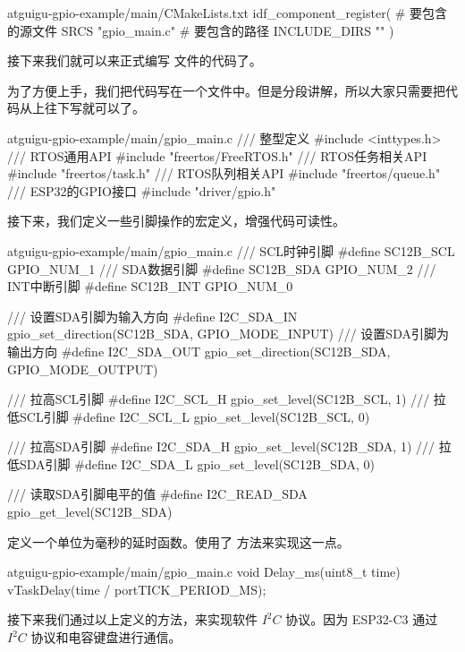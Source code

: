 \documentclass[lang=cn,newtx,10pt,scheme=chinese]{elegantbook}
\begin{document}
\begin{mycode}{atguigu-gpio-example/main/CMakeLists.txt}
idf_component_register(
    # 要包含的源文件
    SRCS "gpio_main.c"
    # 要包含的路径
    INCLUDE_DIRS ""
)
\end{mycode}

接下来我们就可以来正式编写  文件的代码了。

为了方便上手，我们把代码写在一个文件中。但是分段讲解，所以大家只需要把代码从上往下写就可以了。

\begin{mycode}{atguigu-gpio-example/main/gpio\_main.c}
/// 整型定义
#include <inttypes.h>
/// RTOS通用API
#include "freertos/FreeRTOS.h"
/// RTOS任务相关API
#include "freertos/task.h"
/// RTOS队列相关API
#include "freertos/queue.h"
/// ESP32的GPIO接口
#include "driver/gpio.h"
\end{mycode}

接下来，我们定义一些引脚操作的宏定义，增强代码可读性。

\begin{mycode}{atguigu-gpio-example/main/gpio\_main.c}
/// SCL时钟引脚
#define SC12B_SCL GPIO_NUM_1
/// SDA数据引脚
#define SC12B_SDA GPIO_NUM_2
/// INT中断引脚
#define SC12B_INT GPIO_NUM_0

/// 设置SDA引脚为输入方向
#define I2C_SDA_IN gpio_set_direction(SC12B_SDA, GPIO_MODE_INPUT)
/// 设置SDA引脚为输出方向
#define I2C_SDA_OUT gpio_set_direction(SC12B_SDA, GPIO_MODE_OUTPUT)

/// 拉高SCL引脚
#define I2C_SCL_H gpio_set_level(SC12B_SCL, 1)
/// 拉低SCL引脚
#define I2C_SCL_L gpio_set_level(SC12B_SCL, 0)

/// 拉高SDA引脚
#define I2C_SDA_H gpio_set_level(SC12B_SDA, 1)
/// 拉低SDA引脚
#define I2C_SDA_L gpio_set_level(SC12B_SDA, 0)

/// 读取SDA引脚电平的值
#define I2C_READ_SDA gpio_get_level(SC12B_SDA)
\end{mycode}

定义一个单位为毫秒的延时函数。使用了  方法来实现这一点。

\begin{mycode}{atguigu-gpio-example/main/gpio\_main.c}
void Delay_ms(uint8_t time)
{
    vTaskDelay(time / portTICK_PERIOD_MS);
}
\end{mycode}

接下来我们通过以上定义的方法，来实现软件 $I^2C$ 协议。因为 ESP32-C3 通过 $I^2C$ 协议和电容键盘进行通信。
\end{document}
